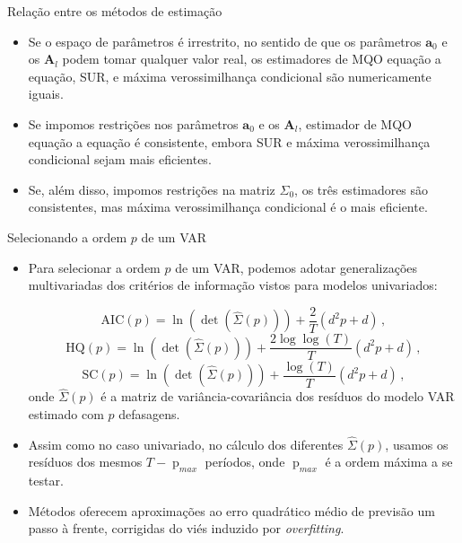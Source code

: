 \documentclass[11pt]{beamer}
\begin{document}
\begin{frame}{Relação entre os métodos de estimação}
\begin{itemize}
	\item Se o espaço de parâmetros é irrestrito, no sentido de que os parâmetros $\boldsymbol{a}_0$ e os $\boldsymbol{A}_l$ podem tomar qualquer valor real, os estimadores de MQO equação a equação, SUR, e máxima verossimilhança condicional são {\color{blue}numericamente iguais}.
	\item Se impomos restrições nos parâmetros $\boldsymbol{a}_0$ e os $\boldsymbol{A}_l$, estimador de MQO equação a equação é consistente, embora SUR e máxima verossimilhança condicional sejam mais eficientes.
	\item Se, além disso, impomos restrições na matriz ${\Sigma}_0$, os três estimadores são consistentes, mas máxima verossimilhança condicional é o mais eficiente.
\end{itemize}
\end{frame}

\begin{frame}{Selecionando a ordem $p$ de um VAR}
	\begin{itemize}
		\item Para selecionar a ordem $p$ de um VAR, podemos adotar generalizações multivariadas dos critérios de informação vistos para modelos univariados:
		
		$$\text{AIC}(p) = \operatorname{ln}(\operatorname{det}(\hat\Sigma(p))) + \frac{2}{T}(d^2 p + d)\, ,$$
						$$\text{HQ}(p) = \operatorname{ln}(\operatorname{det}(\hat\Sigma(p))) + \frac{2 \log \log(T)}{T}(d^2 p + d)\, ,$$
				$$\text{SC}(p) = \operatorname{ln}(\operatorname{det}(\hat\Sigma(p))) + \frac{\log(T)}{T}(d^2 p + d)\, ,$$
	onde $\hat \Sigma(p)$ é a matriz de variância-covariância dos resíduos do modelo VAR estimado com $p$ defasagens. 
	\item Assim como no caso univariado, no cálculo dos diferentes $\hat \Sigma(p)$, usamos os resíduos dos mesmos $T-\operatorname{p}_{max}$ períodos, onde $\operatorname{p}_{max}$ é a ordem máxima a se testar.
	\item Métodos oferecem aproximações ao erro quadrático médio de previsão um passo à frente, corrigidas do viés induzido por \textit{overfitting}.
	\end{itemize}
\end{frame}
\end{document}
